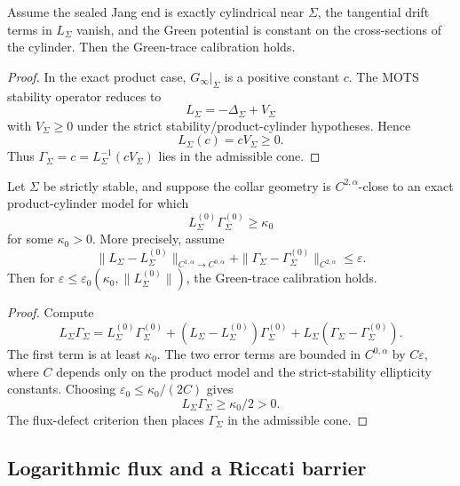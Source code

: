 \begin{proposition}\label{prop:ProductCylinderCalibration}
Assume the sealed Jang end is exactly cylindrical near \(\Sigma\), the tangential drift terms in \(L_\Sigma\) vanish, and the Green potential is constant on the cross-sections of the cylinder. Then the Green-trace calibration holds.
\end{proposition}

\begin{proof}
In the exact product case, \(G_\infty|_\Sigma\) is a positive constant \(c\). The MOTS stability operator reduces to
\[
    L_\Sigma=-\Delta_\Sigma+V_\Sigma
\]
with \(V_\Sigma\ge0\) under the strict stability/product-cylinder hypotheses. Hence
\[
    L_\Sigma(c)=cV_\Sigma\ge0.
\]
Thus \(\Gamma_\Sigma=c=L_\Sigma^{-1}(cV_\Sigma)\) lies in the admissible cone.
\end{proof}

\begin{theorem}\label{thm:PerturbativeGreenTraceCalibration}
Let \(\Sigma\) be strictly stable, and suppose the collar geometry is \(C^{2,\alpha}\)-close to an exact product-cylinder model for which
\[
    L_\Sigma^{(0)}\Gamma_\Sigma^{(0)}\ge \kappa_0
\]
for some \(\kappa_0>0\). More precisely, assume
\[
    \|L_\Sigma-L_\Sigma^{(0)}\|_{C^{1,\alpha}\to C^{0,\alpha}}
    +
    \|\Gamma_\Sigma-\Gamma_\Sigma^{(0)}\|_{C^{2,\alpha}}
    \le \varepsilon .
\]
Then for \(\varepsilon\le\varepsilon_0(\kappa_0,\|L_\Sigma^{(0)}\|)\), the Green-trace calibration holds.
\end{theorem}

\begin{proof}
Compute
\[
    L_\Sigma\Gamma_\Sigma
    =
    L_\Sigma^{(0)}\Gamma_\Sigma^{(0)}
    +(L_\Sigma-L_\Sigma^{(0)})\Gamma_\Sigma^{(0)}
    +L_\Sigma(\Gamma_\Sigma-\Gamma_\Sigma^{(0)}).
\]
The first term is at least \(\kappa_0\). The two error terms are bounded in \(C^{0,\alpha}\) by \(C\varepsilon\), where \(C\) depends only on the product model and the strict-stability ellipticity constants. Choosing \(\varepsilon_0\le\kappa_0/(2C)\) gives
\[
    L_\Sigma\Gamma_\Sigma\ge \kappa_0/2>0.
\]
The flux-defect criterion then places \(\Gamma_\Sigma\) in the admissible cone.
\end{proof}

\subsection{Logarithmic flux and a Riccati barrier}
\label{subsec:LogFluxRiccati}

